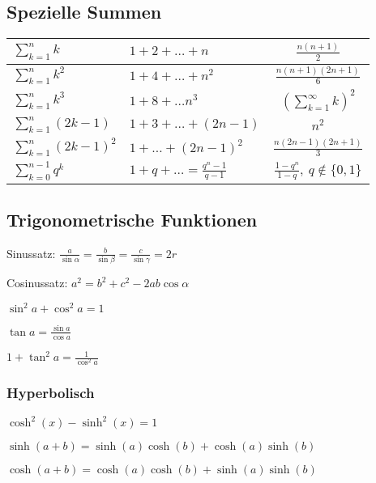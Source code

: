 \subsection{Spezielle Summen}
\begin{tabular}{l | l | c}
    $\sum_{k=1}^{n} k$ & $1 + 2 + \dots + n$ & $\frac{n(n+1)}{2}$\\\hline
    $\sum_{k=1}^{n} k^2$ & $1 + 4 + \dots + n^2$ & $\frac{n(n+1)(2n+1)}{6}$\\\hline
    $\sum_{k=1}^{n} k^3$ & $1 + 8 + \dots n^3$ & $\left( \sum_{k=1}^{\infty} k  \right)^2$\\\hline
    $\sum_{k=1}^{n} (2k - 1)$ & $1 + 3 + \dots + (2n -1)$ & $n^2$\\\hline
    $\sum_{k=1}^{n} (2k - 1)^2$ & $1 + \dots + (2n - 1)^2$ & $\frac{n(2n-1)(2n+1)}{3}$\\\hline
    $\sum_{k=0}^{n-1} q^k$ & $1 + q + \dots = \frac{q^n-1}{q-1}$ & $\frac{1 - q^n}{1-q}, \ q \not\in \{0, 1\}$\\\hline
\end{tabular}

\subsection{Trigonometrische Funktionen}
\begin{compactdesc}
    \item[Sinussatz:] $\frac{a}{\sin \alpha} = \frac{b}{\sin \beta} = \frac{c}{\sin \gamma} = 2r$
    \item[Cosinussatz:] $a^2 = b^2 + c^2 - 2ab \cos \alpha$
\end{compactdesc}
\begin{compactitem}
    \item $\sin^2a + \cos^2a = 1$
    \item $\tan a = \frac{\sin a}{\cos a}$
    \item $1 + \tan^2 a = \frac{1}{\cos^2 a}$
\end{compactitem}

\subsubsection{Hyperbolisch}
\begin{compactitem}
    \item $\cosh^2(x) - \sinh^2(x) = 1$
    \item $\sinh(a + b) = \sinh(a)\cosh(b) + \cosh(a)\sinh(b)$
    \item $\cosh(a + b) = \cosh(a)\cosh(b) + \sinh(a)\sinh(b)$
\end{compactitem}

